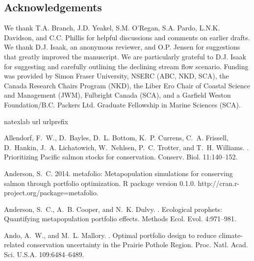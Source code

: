 \documentclass[12pt,english]{article}
\begin{document}
\begin{spacing}{1.9}
\section{Acknowledgements}\label{acknowledgements}

We thank T.A. Branch, J.D. Yeakel, S.M. O'Regan, S.A. Pardo, L.N.K. Davidson, and C.C. Phillis for helpful discussions and comments on earlier drafts. We thank D.J. Isaak, an anonymous reviewer, and O.P. Jensen for suggestions that greatly improved the manuscript. We are particularly grateful to D.J. Isaak for suggesting and carefully outlining the declining stream flow scenario. Funding was provided by Simon Fraser University, NSERC (ABC, NKD, SCA), the Canada Research Chairs Program (NKD), the Liber Ero Chair of Coastal Science and Management (JWM), Fulbright Canada (SCA), and a Garfield Weston Foundation/B.C. Packers Ltd. Graduate Fellowship in Marine Sciences (SCA).

%
%
%
\begin{thebibliography}{64}
\expandafter\ifx\csname natexlab\endcsname\relax\def\natexlab#1{#1}\fi
\expandafter\ifx\csname url\endcsname\relax
  \def\url#1{{\tt #1}}\fi
\expandafter\ifx\csname urlprefix\endcsname\relax\def\urlprefix{URL }\fi

Allendorf, F.~W., D.~Bayles, D.~L. Bottom, K.~P. Currens, C.~A. Frissell,
  D.~Hankin, J.~A. Lichatowich, W.~Nehlsen, P.~C. Trotter, and T.~H. Williams.
.
\newblock Prioritizing {Pacific} salmon stocks for conservation.
\newblock Conserv. Biol. 11:140--152.

Anderson, S.~C. 2014.
\newblock metafolio: Metapopulation simulations for conserving salmon through 
  portfolio optimization. R package version 0.1.0.
  http://cran.r-project.org/package=metafolio.

Anderson, S.~C., A.~B. Cooper, and N.~K. Dulvy.
.
\newblock Ecological prophets: Quantifying metapopulation portfolio effects.
\newblock Methods Ecol. Evol. 4:971--981.

Ando, A.~W., and M.~L. Mallory.
.
\newblock Optimal portfolio design to reduce climate-related conservation
  uncertainty in the {Prairie Pothole Region}.
\newblock Proc. Natl. Acad. Sci. U.S.A. 109:6484--6489.


\end{thebibliography}
\end{spacing}
\end{document}
